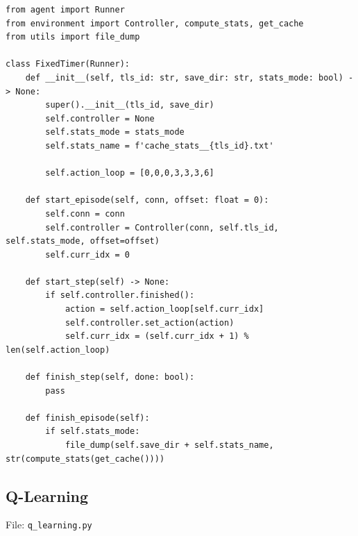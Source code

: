 \documentclass[a4paper]{report}
\begin{document}
\begin{lstlisting}[style=pythonstyle]
from agent import Runner
from environment import Controller, compute_stats, get_cache
from utils import file_dump

class FixedTimer(Runner):
    def __init__(self, tls_id: str, save_dir: str, stats_mode: bool) -> None:
        super().__init__(tls_id, save_dir)
        self.controller = None
        self.stats_mode = stats_mode
        self.stats_name = f'cache_stats__{tls_id}.txt'

        self.action_loop = [0,0,0,3,3,3,6]

    def start_episode(self, conn, offset: float = 0):
        self.conn = conn
        self.controller = Controller(conn, self.tls_id, self.stats_mode, offset=offset)
        self.curr_idx = 0
        
    def start_step(self) -> None:
        if self.controller.finished():
            action = self.action_loop[self.curr_idx]
            self.controller.set_action(action)
            self.curr_idx = (self.curr_idx + 1) % len(self.action_loop)

    def finish_step(self, done: bool):
        pass

    def finish_episode(self):
        if self.stats_mode:
            file_dump(self.save_dir + self.stats_name, str(compute_stats(get_cache())))
\end{lstlisting}

\subsection{Q-Learning}

File: \texttt{q\_learning.py}
\end{document}
